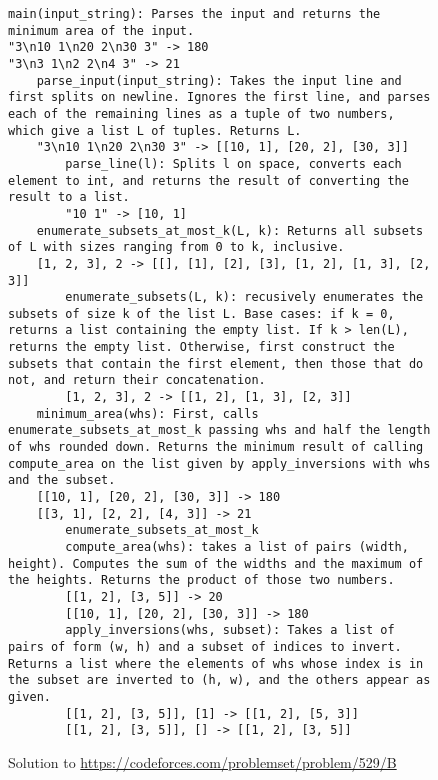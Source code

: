 \begin{figure*}[h]
\begin{lstlisting}
main(input_string): Parses the input and returns the minimum area of the input.
"3\n10 1\n20 2\n30 3" -> 180
"3\n3 1\n2 2\n4 3" -> 21
    parse_input(input_string): Takes the input line and first splits on newline. Ignores the first line, and parses each of the remaining lines as a tuple of two numbers, which give a list L of tuples. Returns L.
    "3\n10 1\n20 2\n30 3" -> [[10, 1], [20, 2], [30, 3]]
        parse_line(l): Splits l on space, converts each element to int, and returns the result of converting the result to a list.
        "10 1" -> [10, 1]
    enumerate_subsets_at_most_k(L, k): Returns all subsets of L with sizes ranging from 0 to k, inclusive.
    [1, 2, 3], 2 -> [[], [1], [2], [3], [1, 2], [1, 3], [2, 3]]
        enumerate_subsets(L, k): recusively enumerates the subsets of size k of the list L. Base cases: if k = 0, returns a list containing the empty list. If k > len(L), returns the empty list. Otherwise, first construct the subsets that contain the first element, then those that do not, and return their concatenation.
        [1, 2, 3], 2 -> [[1, 2], [1, 3], [2, 3]]
    minimum_area(whs): First, calls enumerate_subsets_at_most_k passing whs and half the length of whs rounded down. Returns the minimum result of calling compute_area on the list given by apply_inversions with whs and the subset.
    [[10, 1], [20, 2], [30, 3]] -> 180
    [[3, 1], [2, 2], [4, 3]] -> 21
        enumerate_subsets_at_most_k
        compute_area(whs): takes a list of pairs (width, height). Computes the sum of the widths and the maximum of the heights. Returns the product of those two numbers.
        [[1, 2], [3, 5]] -> 20
        [[10, 1], [20, 2], [30, 3]] -> 180
        apply_inversions(whs, subset): Takes a list of pairs of form (w, h) and a subset of indices to invert. Returns a list where the elements of whs whose index is in the subset are inverted to (h, w), and the others appear as given.
        [[1, 2], [3, 5]], [1] -> [[1, 2], [5, 3]]
        [[1, 2], [3, 5]], [] -> [[1, 2], [3, 5]]
\end{lstlisting}
\caption{Solution to \url{https://codeforces.com/problemset/problem/529/B}}
\end{figure*}

